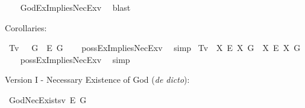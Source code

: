 \begin{isabellebody}
%
\isadelimproof
\ \ %
\endisadelimproof
%
\isatagproof
{}\isamarkupfalse%
\ GodExImpliesNecEx{\isacharunderscore}v{}\ \isamarkupfalse%
\ blast%
\endisatagproof
{\isafoldproof}%
%
\isadelimproof
%
\endisadelimproof
%
\begin{isamarkuptext}%
Corollaries:%
\end{isamarkuptext}\isamarkuptrue%
\isamarkupfalse%
\ T{}{\isacharunderscore}v{}{\isacharcolon}\ \ {\isachardoublequoteopen}{\isasymlfloor}\isactrlbold {\isasymdiamond}\isactrlbold {\isasymexists}\ \isactrlbold {\isasymdown}G{\isasymrfloor}\ {\isasymlongrightarrow}\ {\isasymlfloor}\isactrlbold {\isasymbox}\isactrlbold {\isasymexists}\isactrlsup E\ \isactrlbold {\isasymdown}G{\isasymrfloor}{\isachardoublequoteclose}\isanewline
%
\isadelimproof
\ \ %
\endisadelimproof
%
\isatagproof
{}\isamarkupfalse%
\ possExImpliesNecEx{\isacharunderscore}v{}\ \isamarkupfalse%
\ simp%
\endisatagproof
{\isafoldproof}%
%
\isadelimproof
\isanewline
%
\endisadelimproof
{}\isamarkupfalse%
\ T{}{\isacharunderscore}v{}{\isacharcolon}\ \ {\isachardoublequoteopen}{\isasymlfloor}{\isacharparenleft}{\isasymlambda}X{\isachardot}\ \isactrlbold {\isasymdiamond}\isactrlbold {\isasymexists}\isactrlsup E\ X{\isacharparenright}\ \isactrlbold {\isasymdown}G{\isasymrfloor}\ {\isasymlongrightarrow}\ {\isasymlfloor}{\isacharparenleft}{\isasymlambda}X{\isachardot}\ \isactrlbold {\isasymbox}\isactrlbold {\isasymexists}\isactrlsup E\ X{\isacharparenright}\ \isactrlbold {\isasymdown}G{\isasymrfloor}{\isachardoublequoteclose}\isanewline
%
\isadelimproof
\ \ %
\endisadelimproof
%
\isatagproof
{}\isamarkupfalse%
\ possExImpliesNecEx{\isacharunderscore}v{}\ \isamarkupfalse%
\ simp%
\endisatagproof
{\isafoldproof}%
%
\isadelimproof
%
\endisadelimproof
%
\isamarkuptrue%
%
\begin{isamarkuptext}%
Version I - Necessary Existence of God (\emph{de dicto}):%
\end{isamarkuptext}\isamarkuptrue%
\isamarkupfalse%
\ GodNecExists{\isacharunderscore}v{}{\isacharcolon}\ {\isachardoublequoteopen}{\isasymlfloor}\isactrlbold {\isasymbox}\isactrlbold {\isasymexists}\isactrlsup E\ \isactrlbold {\isasymdown}G{\isasymrfloor}{\isachardoublequoteclose}\isanewline
%
\isadelimproof
\ \ %
\endisadelimproof
%

\end{isabellebody}
